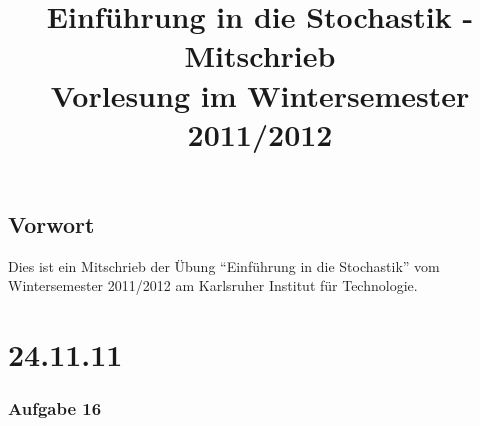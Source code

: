 \documentclass[a4paper,11pt,notitlepage]{report}
\title{\textbf{{Einführung in die Stochastik - Mitschrieb} \\[5ex] 
    {\Large Vorlesung im Wintersemester 2011/2012\\[5ex]}}}
\author{\myname{Sarah Lutteropp}}
\begin{document}
\maketitle
\setcounter{tocdepth}{1}
\tableofcontents

\section*{Vorwort}
Dies ist ein Mitschrieb der Übung “Einführung in die Stochastik” vom Wintersemester 2011/2012 am Karlsruher Institut für Technologie.

\chapter{24.11.11}

\subsection{Aufgabe 16}
\end{document}
